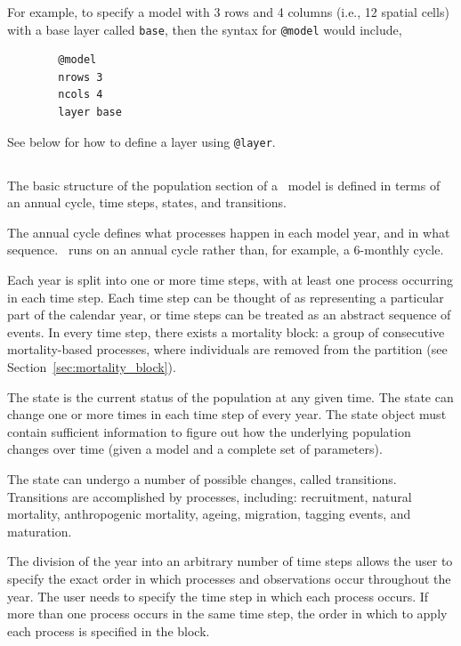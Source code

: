 For example, to specify a model with 3 rows and 4 columns (i.e., 12 spatial cells) with a base layer called \texttt{base}, then the syntax for \texttt{@model} would include,
{\small{\begin{verbatim}
		@model
		nrows 3
		ncols 4
		layer base
		\end{verbatim}}}

See below for how to define a layer using \texttt{@layer}. 


\subsection{}\label{sub:sec:pop_sec}
The basic structure of the population section of a \IBM\ model is defined in terms of an annual cycle, time steps, states, and transitions.

The annual cycle defines what processes happen in each model year, and in what sequence. \IBM\ runs on an annual cycle rather than, for example, a 6-monthly cycle.

Each year is split into one or more time steps, with at least one process occurring in each time step. Each time step can be thought of as representing a particular part of the calendar year, or time steps can be treated as an abstract sequence of events. In every time step, there exists a mortality block: a group of consecutive mortality-based processes, where individuals are removed from the partition (see Section~\ref{sec:mortality_block}).

The state is the current status of the population at any given time. The state can change one or more times in each time step of every year. The state object must contain sufficient information to figure out how the underlying population changes over time (given a model and a complete set of parameters).

The state can undergo a number of possible changes, called transitions. Transitions are accomplished by processes, including: recruitment, natural mortality, anthropogenic mortality, ageing, migration, tagging events, and maturation. 

The division of the year into an arbitrary number of time steps allows the user to specify the exact order in which processes and observations occur throughout the year. The user needs to specify the time step in which each process occurs. If more than one process occurs in the same time step, the order in which to apply each process is specified in the  block.

